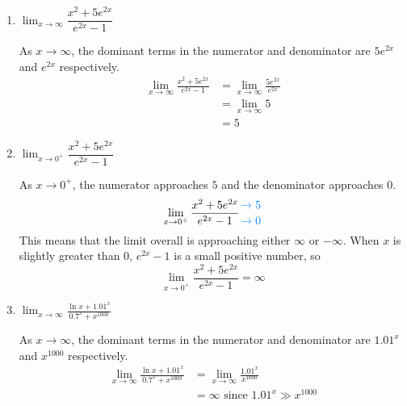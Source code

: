\documentclass{article}
\begin{document}
\begin{enumerate}[resume]
\begin{enumerate}
  \item

    \begin{problem}[\vfill]
      $\displaystyle \lim_{x \to \infty} \dfrac{x^2 + 5 e^{2x}}{e^{2x} - 1}$
    \end{problem}

    \begin{solution}
      As $x\to \infty$, the dominant terms in the numerator and denominator
      are $5e^{2x}$ and $e^{2x}$ respectively.
      \begin{align*}
        \lim_{x \to \infty} \frac{x^2 + 5 e^{2x}}{e^{2x} - 1} &=
        \lim_{x \to \infty} \frac{5e^{2x}}{e^{2x}} \\
        &= \lim_{x \to \infty} 5 \\
        &= 5
      \end{align*}
    \end{solution}

  \item


    \begin{problem}[\vfill]
      $\displaystyle \lim_{x \to 0^+} \dfrac{x^2 + 5 e^{2x}}{e^{2x} - 1}$
    \end{problem}

    \begin{solution}
      As $x\to 0^+$, the numerator approaches $5$ and the denominator
      approaches $0$.
      \[\lim_{x \to 0^+} \frac{x^2 + 5e^{2x}}{e^{2x}-1} \genfrac{}{}{0pt}{}{\color{skyblue} \to 5}{\color{skyblue} \to 0}\]
      This means that the limit overall is approaching either $\infty$
      or $-\infty$. When $x$ is slightly greater than $0$,
      $e^{2x}-1$ is a small positive number,
      so
      \[\lim_{x \to 0^+} \frac{x^2 + 5e^{2x}}{e^{2x}-1}=\infty\]
    \end{solution}

  \item
    \begin{problem}[\vfill]
      $\displaystyle \lim_{x \to \infty} \frac{\ln x + 1.01^x}{0.7^x + x^{1000}}$ 
    \end{problem}

     \begin{solution}
      As $x\to \infty$, the dominant terms in the numerator and denominator
      are $1.01^x$ and $x^{1000}$ respectively.
      \begin{align*}
        \lim_{x \to \infty} \frac{\ln x + 1.01^x}{0.7^x + x^{1000}} 
        &= \lim_{x \to \infty} \frac{1.01^x}{x^{1000}} \\
        &= \infty \text{ since $1.01^x \gg x^{1000}$}
      \end{align*}
    \end{solution}


\end{enumerate}
\end{enumerate}
\end{document}
